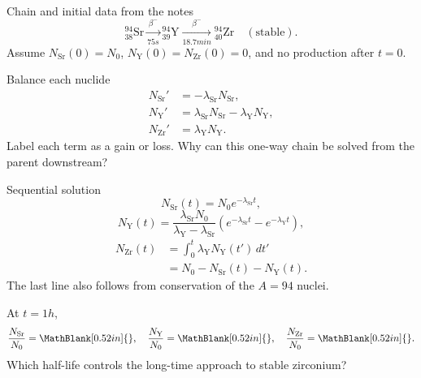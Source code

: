 \newpage
\begin{handoutcolumns}


\begin{fixedbox}{Chain and initial data from the notes}
\[
{}^{94}_{38}\mathrm{Sr}
 \xrightarrow[75\unit{s}]{\beta^-}
{}^{94}_{39}\mathrm{Y}
 \xrightarrow[18.7\unit{min}]{\beta^-}
{}^{94}_{40}\mathrm{Zr}\quad(\text{stable}).
\]
Assume $N_{\mathrm{Sr}}(0)=N_0$,
$N_{\mathrm{Y}}(0)=N_{\mathrm{Zr}}(0)=0$, and no production after $t=0$.
\end{fixedbox}

\begin{boardbox}{Balance each nuclide}
\begin{align*}
 N_{\mathrm{Sr}}'&=-\lambda_{\mathrm{Sr}}N_{\mathrm{Sr}},\\
 N_{\mathrm{Y}}'&=\lambda_{\mathrm{Sr}}N_{\mathrm{Sr}}
                  -\lambda_{\mathrm{Y}}N_{\mathrm{Y}},\\
 N_{\mathrm{Zr}}'&=\lambda_{\mathrm{Y}}N_{\mathrm{Y}}.
\end{align*}
Label each term as a gain or loss.  Why can this one-way chain be solved from
the parent downstream?
\end{boardbox}

\begin{fixedbox}{Sequential solution}
\[
 N_{\mathrm{Sr}}(t)=N_0e^{-\lambda_{\mathrm{Sr}}t},
\]
\[
 N_{\mathrm{Y}}(t)
 =\frac{\lambda_{\mathrm{Sr}}N_0}
 {\lambda_{\mathrm{Y}}-\lambda_{\mathrm{Sr}}}
 \left(e^{-\lambda_{\mathrm{Sr}}t}-e^{-\lambda_{\mathrm{Y}}t}\right),
\]
\[
 \begin{aligned}
 N_{\mathrm{Zr}}(t)
 &=\int_0^t\lambda_{\mathrm{Y}}N_{\mathrm{Y}}(t')\,dt'\\[-1pt]
 &=N_0-N_{\mathrm{Sr}}(t)-N_{\mathrm{Y}}(t).
 \end{aligned}
\]
The last line also follows from conservation of the $A=94$ nuclei.
\end{fixedbox}

\begin{checkpoint}
At $t=1\unit{h}$,
\[
 \frac{N_{\mathrm{Sr}}}{N_0}=\MathBlank[0.52in]{},\quad
 \frac{N_{\mathrm{Y}}}{N_0}=\MathBlank[0.52in]{},\quad
 \frac{N_{\mathrm{Zr}}}{N_0}=\MathBlank[0.52in]{}.
\]
Which half-life controls the long-time approach to stable zirconium?
\end{checkpoint}

\switchcolumn


\end{handoutcolumns}
